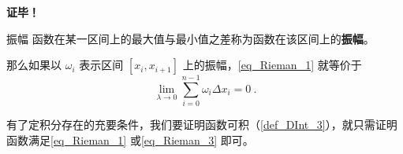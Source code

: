 \textbf{证毕！}

\begin{definition}{振幅}\label{def_Rieman_1}
函数在某一区间上的最大值与最小值之差称为函数在该区间上的\textbf{振幅}。
\end{definition}
那么如果以 $\omega_i$ 表示区间 $[x_i,x_{i+1}]$ 上的振幅，\autoref{eq_Rieman_1} 就等价于
\begin{equation}\label{eq_Rieman_3}
\lim_{\lambda\rightarrow0}\sum_{i=0}^{n-1}\omega_i\Delta x_i=0~.
\end{equation}

有了定积分存在的充要条件，我们要证明函数可积（\autoref{def_DInt_3}），就只需证明函数满足\autoref{eq_Rieman_1} 或\autoref{eq_Rieman_3} 即可。






